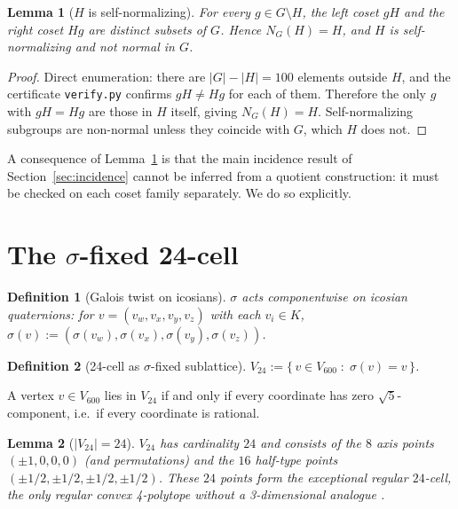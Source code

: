 \documentclass[11pt]{article}
\newtheorem{lemma}{Lemma}[section]
\newtheorem{definition}{Definition}[section]
\newcommand{\Vsixhundred}{V_{600}}
\newcommand{\Vtwentyfour}{V_{24}}
\newcommand{\sigmaG}{\sigma}
\begin{document}
\begin{lemma}[$H$ is self-normalizing]\label{lem:nonnormal}
For every $g \in G \setminus H$, the left coset $gH$ and the right coset
$Hg$ are distinct subsets of $G$. Hence $N_G(H) = H$, and $H$ is
self-normalizing and \emph{not} normal in $G$.
\end{lemma}

\begin{proof}
Direct enumeration: there are $|G| - |H| = 100$ elements outside $H$,
and the certificate \texttt{verify.py} confirms $gH \neq Hg$ for each
of them. Therefore the only $g$ with $gH = Hg$ are those in $H$
itself, giving $N_G(H) = H$. Self-normalizing subgroups are non-normal
unless they coincide with $G$, which $H$ does not.
\end{proof}

A consequence of Lemma~\ref{lem:nonnormal} is that the main incidence
result of Section~\ref{sec:incidence} cannot be inferred from a quotient
construction: it must be checked on each coset family separately. We do
so explicitly.

\section{The $\sigmaG$-fixed 24-cell}\label{sec:24cell}

\begin{definition}[Galois twist on icosians]\label{def:galois}
$\sigmaG$ acts componentwise on icosian quaternions: for
$v = (v_w, v_x, v_y, v_z)$ with each $v_i \in K$,
$\sigmaG(v) := (\sigmaG(v_w), \sigmaG(v_x), \sigmaG(v_y), \sigmaG(v_z))$.
\end{definition}

\begin{definition}[24-cell as $\sigmaG$-fixed sublattice]\label{def:V24}
$\Vtwentyfour := \{\, v \in \Vsixhundred \;:\; \sigmaG(v) = v \,\}$.
\end{definition}

A vertex $v \in \Vsixhundred$ lies in $\Vtwentyfour$ if and only if
every coordinate has zero $\sqrt{5}$-component, i.e.\ if every
coordinate is rational.

\begin{lemma}[$|\Vtwentyfour| = 24$]\label{lem:24cell}
$\Vtwentyfour$ has cardinality $24$ and consists of the $8$ axis points
$(\pm 1, 0, 0, 0)$ (and permutations) and the $16$ half-type points
$(\pm 1/2, \pm 1/2, \pm 1/2, \pm 1/2)$. These $24$ points form the
exceptional regular $24$-cell, the only regular convex 4-polytope
without a 3-dimensional analogue \citep{Coxeter1973}.
\end{lemma}
\end{document}
